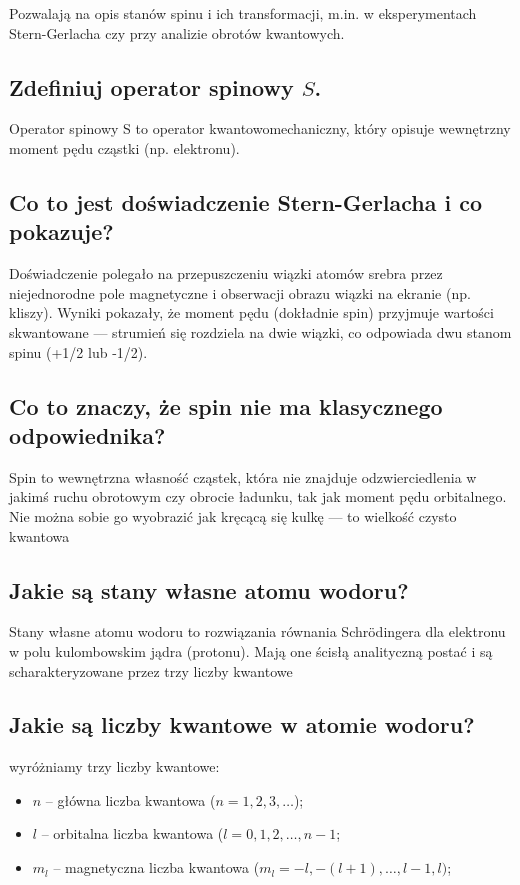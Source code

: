 Pozwalają na opis stanów spinu i ich transformacji, m.in. w eksperymentach Stern-Gerlacha czy przy analizie obrotów kwantowych.

\subsection{Zdefiniuj operator spinowy $S$.}

Operator spinowy S to operator kwantowomechaniczny, który opisuje wewnętrzny moment pędu cząstki (np. elektronu).

\subsection{Co to jest doświadczenie Stern-Gerlacha i co pokazuje?}

Doświadczenie polegało na przepuszczeniu wiązki atomów srebra przez niejednorodne pole magnetyczne i obserwacji obrazu wiązki na ekranie (np. kliszy). Wyniki pokazały, że moment pędu (dokładnie spin) przyjmuje wartości skwantowane — strumień się rozdziela na dwie wiązki, co odpowiada dwu stanom spinu (+1/2 lub -1/2).

\subsection{Co to znaczy, że spin nie ma klasycznego odpowiednika?}

Spin to wewnętrzna własność cząstek, która nie znajduje odzwierciedlenia w jakimś ruchu obrotowym czy obrocie ładunku, tak jak moment pędu orbitalnego. Nie można sobie go wyobrazić jak kręcącą się kulkę — to wielkość czysto kwantowa

\subsection{Jakie są stany własne atomu wodoru?}

Stany własne atomu wodoru to rozwiązania równania Schrödingera dla elektronu w polu kulombowskim jądra (protonu). Mają one ścisłą analityczną postać i są scharakteryzowane przez trzy liczby kwantowe

\subsection{Jakie są liczby kwantowe w atomie wodoru?}
wyróżniamy trzy liczby kwantowe:
\begin{itemize}
  \item $n$ -- główna liczba kwantowa ($n=1,2,3,\dots$);
  \item $l$ -- orbitalna liczba kwantowa ($l=0,1,2,\dots,n-1$;
  \item $m_l$ -- magnetyczna liczba kwantowa ($m_l= -l,-(l+1),\dots, l-1, l)$;
\end{itemize}

